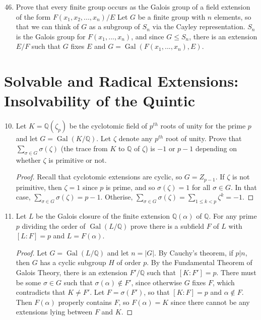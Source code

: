 \documentclass{report}
\newcommand{\Q}{\mathbb{Q}}
\DeclareMathOperator{\Gal}{Gal}
\begin{document}
\begin{enumerate}
		\setcounter{enumi}{45}
	\item Prove that every finite group occurs as the Galois group of a field extension of the form $F(x_1,x_2,...,x_n)/E$
		Let $G$ be a finite group with $n$ elements, so that we can think of $G$ as a subgroup of $S_n$ via the Cayley representation.
		$S_n$ is the Galois group for $F(x_1,...,x_n)$, and since $G\leq S_n$, there is an extension $E / F$ such that $G$ fixes $E$ and $G=\Gal(F(x_1,...,x_n),E)$.
\end{enumerate}

\section{Solvable and Radical Extensions: Insolvability of the Quintic}
\begin{enumerate} 
	\setcounter{enumi}{9}
	\item Let $K=\Q(\zeta_p)$ be the cyclotomic field of $p^{th}$ roots of unity for the prime $p$ and let $G=\Gal(K /\Q)$.
		Let $\zeta$ denote any $p^{th}$ root of unity. Prove that $\sum_{\sigma\in G}\sigma(\zeta)$ (the trace from $K$ to $\Q$ of $\zeta$) is $-1$ or $p-1$
		depending on whether $\zeta$ is primitive or not.
		\begin{proof}
			Recall that cyclotomic extensions are cyclic, so $G=Z_{p-1}$.  If $\zeta$ is not primitive, then $\zeta=1$ since $p$ is prime, and so $\sigma(\zeta)=1$ for all $\sigma\in G$.
			In that case, $\sum_{\sigma\in G}\sigma(\zeta)=p-1$. Otherise, $\sum_{\sigma\in G}\sigma(\zeta)=\sum_{1\leq k<p}\zeta^k=-1$.
		\end{proof}
		 
		\setcounter{enumi}{11}
	\item Let $L$ be the Galois closure of the finite extension $\Q(\alpha)$ of $\Q$. For any prime $p$ dividing the order of $\Gal(L / \Q)$ prove there is a subfield
		$F$ of $L$ with $[L:F]=p$ and $L=F(\alpha)$.
		\begin{proof}
			Let $G=\Gal(L /\Q)$ and let $n=|G|$. By Cauchy's theorem, if $p | n$, then $G$ has a cyclic subgroup $H$ of order $p$.
			By the Fundamental Theorem of Galois Theory, there is an extension $F' / \Q$ such that $[K:F']=p$.
			There must be some $\sigma\in G$ such that $\sigma(\alpha)\notin F'$, since otherwise $G$ fixes $F$, which contradicts that $K\neq F'$.
			Let $F=\sigma(F')$, so that $[K:F]=p$ and $\alpha\notin F$. Then $F(\alpha)$ properly contains $F$, so $F(\alpha)=K$ since there cannot be any extensions lying between $F$ and $K$.
		\end{proof}
\end{enumerate}
\end{document}
